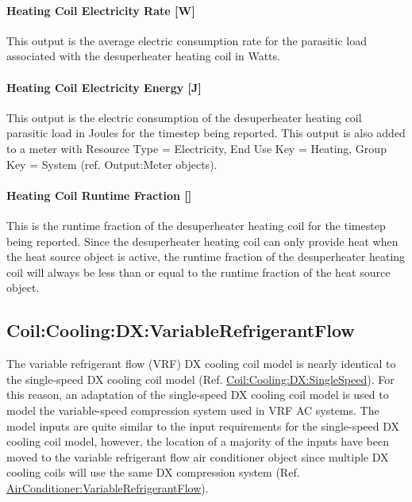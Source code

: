 \paragraph{Heating Coil Electricity Rate {[}W{]}}\label{heating-coil-electric-power-w-2}

This output is the average electric consumption rate for the parasitic load associated with the desuperheater heating coil in Watts.

\paragraph{Heating Coil Electricity Energy {[}J{]}}\label{heating-coil-electric-energy-j-1}

This output is the electric consumption of the desuperheater heating coil parasitic load in Joules for the timestep being reported. This output is also added to a meter with Resource Type = Electricity, End Use Key = Heating, Group Key = System (ref. Output:Meter objects).

\paragraph{Heating Coil Runtime Fraction {[]}}\label{heating-coil-runtime-fraction}

This is the runtime fraction of the desuperheater heating coil for the timestep being reported. Since the desuperheater heating coil can only provide heat when the heat source object is active, the runtime fraction of the desuperheater heating coil will always be less than or equal to the runtime fraction of the heat source object.

\subsection{Coil:Cooling:DX:VariableRefrigerantFlow}\label{coilcoolingdxvariablerefrigerantflow}

The variable refrigerant flow (VRF) DX cooling coil model is nearly identical to the single-speed DX cooling coil model (Ref. \hyperref[coilcoolingdxsinglespeed]{Coil:Cooling:DX:SingleSpeed}). For this reason, an adaptation of the single-speed DX cooling coil model is used to model the variable-speed compression system used in VRF AC systems. The model inputs are quite similar to the input requirements for the single-speed DX cooling coil model, however, the location of a majority of the inputs have been moved to the variable refrigerant flow air conditioner object since multiple DX cooling coils will use the same DX compression system (Ref. \hyperref[airconditionervariablerefrigerantflow]{AirConditioner:VariableRefrigerantFlow}).

